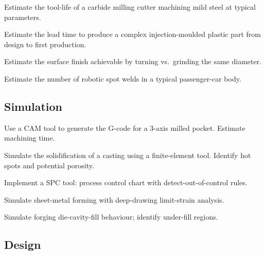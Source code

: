 \begin{exercise}
Estimate the tool-life of a carbide milling cutter machining mild steel at typical parameters.
\end{exercise}

\begin{exercise}
Estimate the lead time to produce a complex injection-moulded plastic part from design to first production.
\end{exercise}

\begin{exercise}
Estimate the surface finish achievable by turning vs.\ grinding the same diameter.
\end{exercise}

\begin{exercise}
Estimate the number of robotic spot welds in a typical passenger-car body.
\end{exercise}

\subsection*{Simulation}

\begin{exercise}
Use a CAM tool to generate the G-code for a 3-axis milled pocket. Estimate machining time.
\end{exercise}

\begin{exercise}
Simulate the solidification of a casting using a finite-element tool. Identify hot spots and potential porosity.
\end{exercise}

\begin{exercise}
Implement a SPC tool: process control chart with detect-out-of-control rules.
\end{exercise}

\begin{exercise}
Simulate sheet-metal forming with deep-drawing limit-strain analysis.
\end{exercise}

\begin{exercise}
Simulate forging die-cavity-fill behaviour; identify under-fill regions.
\end{exercise}

\subsection*{Design}

